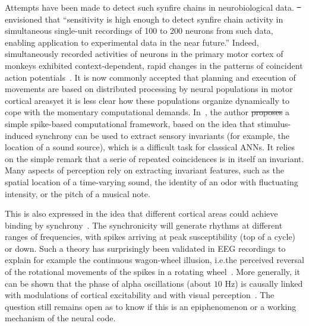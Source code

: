 \documentclass[brainsci, %
               review,accept,pdftex,moreauthors %
               ]{Definitions/mdpi}
\providecommand{\DIFadd}[1]{{\protect\color{blue}\uwave{#1}}} %
\providecommand{\DIFdel}[1]{{\protect\color{red}\sout{#1}}}                      %
\providecommand{\DIFaddbegin}{} %
\providecommand{\DIFaddend}{} %
\providecommand{\DIFdelbegin}{} %
\providecommand{\DIFdelend}{} %
\newcommand{\DIFscaledelfig}{0.5}
\newlength{\DIFdelgraphicswidth} %
\newlength{\DIFdelgraphicsheight} %
\newcommand{\DIFaddincludegraphics}[2][]{{\color{blue}\fbox{\DIFOincludegraphics[#1]{#2}}}} %
\newcommand{\DIFdelincludegraphics}[2][]{%
\sbox{\DIFdelgraphicsbox}{\DIFOincludegraphics[#1]{#2}}%
\settoboxwidth{\DIFdelgraphicswidth}{\DIFdelgraphicsbox} %
\settoboxtotalheight{\DIFdelgraphicsheight}{\DIFdelgraphicsbox} %
\scalebox{\DIFscaledelfig}{%
\parbox[b]{\DIFdelgraphicswidth}{\usebox{\DIFdelgraphicsbox}\\[-\baselineskip] \rule{\DIFdelgraphicswidth}{0em}}\llap{\resizebox{\DIFdelgraphicswidth}{\DIFdelgraphicsheight}{%
\setlength{\unitlength}{\DIFdelgraphicswidth}%
\begin{picture}(1,1)%
\thicklines\linethickness{2pt} %
{\color[rgb]{1,0,0}\put(0,0){\framebox(1,1){}}}%
{\color[rgb]{1,0,0}\put(0,0){\line( 1,1){1}}}%
{\color[rgb]{1,0,0}\put(0,1){\line(1,-1){1}}}%
\end{picture}%
}\hspace*{3pt}}} %
} %
\DeclareRobustCommand{\DIFaddbegin}{\DIFOaddbegin \let\includegraphics\DIFaddincludegraphics} %
\DeclareRobustCommand{\DIFaddend}{\DIFOaddend \let\includegraphics\DIFOincludegraphics} %
\DeclareRobustCommand{\DIFdelbegin}{\DIFOdelbegin \let\includegraphics\DIFdelincludegraphics} %
\DeclareRobustCommand{\DIFdelend}{\DIFOaddend \let\includegraphics\DIFOincludegraphics} %
\begin{document}
Attempts have been made to detect such synfire chains in neurobiological data. \DIFdelbegin \DIFdel{~}\DIFdelend \citet{schrader_detecting_2008} envisioned that ``sensitivity is high enough to detect synfire chain activity in simultaneous single-unit recordings of 100 to 200 neurons from such data, enabling application to experimental data in the near future.'' Indeed, simultaneously recorded activities of neurons in the primary motor cortex of monkeys exhibited context-dependent, rapid changes in the patterns of coincident action potentials~\citep{riehle_spike_1997,grammont_precise_1999}. It is now commonly accepted that \DIFaddbegin \DIFadd{the }\DIFaddend planning and execution of movements are based on distributed processing by neural populations in motor cortical areas\DIFaddbegin \DIFadd{, }\DIFaddend yet it is less clear  how these populations organize dynamically to cope with the momentary computational demands.  In~\citep{brette_computing_2012}, the author \DIFdelbegin \DIFdel{proposes }\DIFdelend \DIFaddbegin \DIFadd{proposed }\DIFaddend a simple spike-based computational framework, based on the idea that stimulus-induced synchrony can be used to extract sensory invariants (for example, the location of a sound source), which is a difficult task for classical ANNs. It relies on the simple remark that a serie of repeated coincidences is in itself an invariant. Many aspects of perception rely on extracting invariant features, such as the spatial location of a time-varying sound, the identity of an odor with fluctuating intensity, or the pitch of a musical note.

This is also expressed in the idea that different cortical areas could achieve binding by synchrony~\citep{fries_mechanism_2005}. The synchronicity will generate rhythms at different ranges of frequencies, with spikes arriving at peak susceptibility (top of a cycle) or down. Such a theory has surprisingly been validated in EEG recordings to explain for example the continuous wagon-wheel illusion, i.e.\DIFaddbegin \DIFadd{, }\DIFaddend the perceived reversal of the rotational movements of the spikes in a rotating wheel~\citep{vanrullen_continuous_2006}. More generally, it can be shown that the phase of alpha oscillations (about $10$ Hz) is causally linked with modulations of cortical excitability and with visual perception~\citep{dugue_phase_2011}. The question still remains open as to know if this is an epiphenomenon or a working mechanism of the neural code.
%
\end{document}

